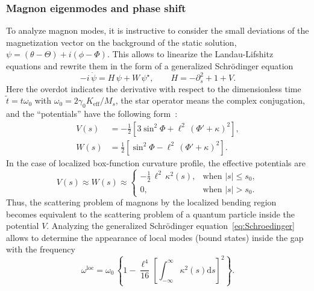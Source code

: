 \subsubsection{Magnon eigenmodes and phase shift} \label{subsubsec:U_wire_eigenmodes}

To analyze magnon modes, it is instructive to consider the small deviations of the magnetization vector on the background of the static solution, $\psi=(\theta-\Theta) + i \left(\phi-\varPhi\right)$. This allows to linearize the Landau-Lifshitz equations and rewrite them in the form of a generalized Schr\"odinger equation~\cite{Sheka04,Ivanov05b,Gaididei18a}
\begin{equation} \label{eq:Schroedinger}
-i \,\dot{\psi} = H \, \psi + W \, \psi^\star, \qquad H = -\partial_s^2 +1+V.
\end{equation}
Here the overdot indicates the derivative with respect to the dimensionless time $\tilde{t}=t\omega_0$ with $\omega_0=2\gamma_0K_\text{eff}/M_s$, the star operator means the complex conjugation, and the ``potentials'' have the following form~\cite{Gaididei18a}:
\begin{equation} \label{eq:V-n-W}
\begin{split}
V(s) &= -\frac{1}{2}\left[3\sin^2\varPhi  + \ell^2 \, \left(\varPhi ' + \kappa\right)^2\right],\\
W(s) &= \frac{1}{2}\left[\sin^2\varPhi  - \ell^2 \, \left(\varPhi ' + \kappa\right)^2\right].
\end{split}
\end{equation}
In the case of localized box-function curvature profile, the effective potentials are~\cite{Gaididei18a} 
\begin{equation} \label{eq:V-n-W-as}
V(s) \approx W(s) \approx
\begin{cases}
-\frac{1}{2} \, \ell^2 \, \kappa^2(s), & \text{when $|s|\leq s_0$},\\
0, &\text{when $|s|> s_0$}.
\end{cases}
\end{equation}
Thus, the scattering problem of magnons by the localized bending region becomes equivalent to the scattering problem of a quantum particle inside the potential $V$. Analyzing the generalized Schr\"odinger equation~\eqref{eq:Schroedinger} allows to determine the appearance of local modes (bound states) inside the gap with the frequency~\cite{Gaididei18a} 
\begin{equation} \label{eq:omega-loc}
\omega^{\text{loc}} = \omega_0 \, \left\{1 - \frac{\ell^4}{16} \left[
\int_{-\infty}^{\infty} \kappa^2(s)\mathrm{d}s\right]^2\right\}.
\end{equation}
